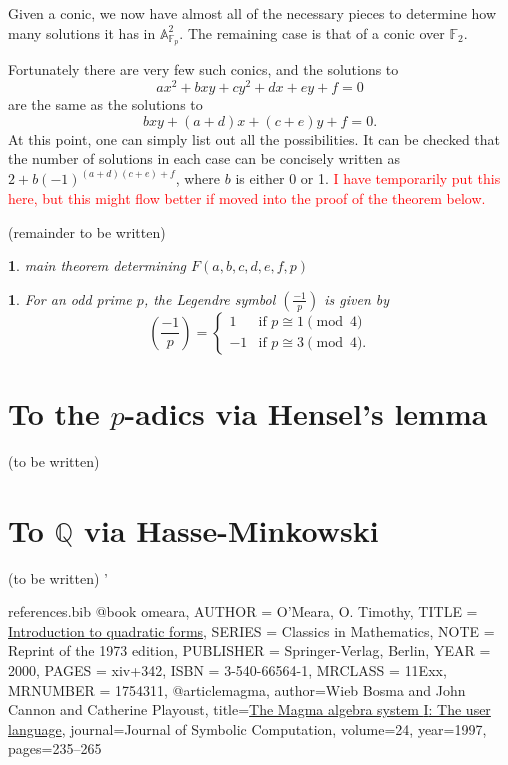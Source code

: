 \documentclass[10pt,a4paper]{amsart}
\numberwithin{equation}{section}
\numberwithin{figure}{section}
\theoremstyle{definition}
\theoremstyle{remark}
\theoremstyle{plain}
\newtheorem{thm}{\protect\theoremname}[section]
\theoremstyle{plain}
\theoremstyle{definition}
\theoremstyle{plain}
\newtheorem{prop}{\protect\propositionname}[section]
\theoremstyle{plain}
\providecommand{\propositionname}{Proposition}
\providecommand{\theoremname}{Theorem}
\newcommand{\legendre}[2]{\genfrac{(}{)}{}{}{#1}{#2}}
\newcommand{\A}{\mathbb{A}}
\newcommand{\F}{\mathbb{F}}
\begin{document}
    Given a conic, we now have almost all of the necessary pieces to determine how
    many solutions it has in $\A^2_{\F_p}$. The remaining case is that of a
    conic over $\F_2$.

    Fortunately there are very few such conics, and the solutions to 
    \[ ax^2 + bxy + cy^2 + dx + ey + f = 0 \] 
    are the same as the solutions to 
    \[ bxy + (a+d)x + (c+e)y + f = 0.  \] 
    At this point, one can simply list out all the
    possibilities. It can be checked that the number of solutions in each case can
    be concisely written as $2 + b(-1)^{(a+d)(c+e) + f}$, where $b$ is either 0 or
    1. \textcolor{red}{I have temporarily put this here, but this might flow better
    if moved into the proof of the theorem below. }

    (remainder to be written)

    \begin{thm} 
        main theorem determining $F(a,b,c,d,e,f,p)$ 
    \end{thm}

    \begin{prop} 
        For an odd prime $p$, the Legendre symbol $\legendre{-1}{p}$ is
        given by 
        \[ \legendre{-1}{p} = \begin{cases} 
            1 & \text{if } p \cong 1 \pmod 4 \\ 
            -1 & \text{if } p \cong 3 \pmod 4.  
        \end{cases} \]
    \end{prop}

    \section{To the $p$-adics via Hensel's lemma} (to be written)

    \section{To $\mathbb{Q}$ via Hasse-Minkowski} (to be written) '

\begin{filecontents}{references.bib}
@book {omeara,
    AUTHOR = {O'Meara, O. Timothy},
     TITLE = {\href{https://link.springer.com/book/10.1007\%2F978-3-642-62031-7}{Introduction to quadratic forms}},
    SERIES = {Classics in Mathematics},
      NOTE = {Reprint of the 1973 edition},
 PUBLISHER = {Springer-Verlag, Berlin},
      YEAR = {2000},
     PAGES = {xiv+342},
      ISBN = {3-540-66564-1},
   MRCLASS = {11Exx},
  MRNUMBER = {1754311},
}
@article{magma,
author={Wieb Bosma and John Cannon and Catherine Playoust},
title={\href{http://www.sciencedirect.com/science/article/pii/S074771719690125X}{The Magma algebra system {I}: The user language}},
journal={Journal of Symbolic Computation},
volume={24},
year={1997},
pages={235--265}
}
\end{filecontents}



\end{document}
